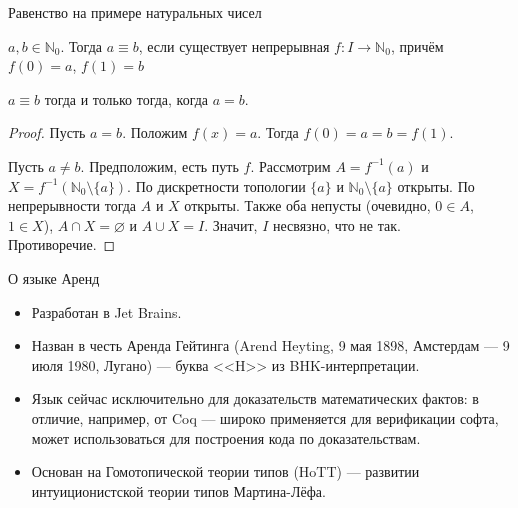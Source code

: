 \documentclass[aspectratio=169,dvipsnames,usenames]{beamer}
\begin{document}
\begin{frame}{Равенство на примере натуральных чисел}
\begin{dfn}$a,b \in \mathbb{N}_0$. Тогда $a\equiv b$, если существует непрерывная $f: I\rightarrow\mathbb{N}_0$, причём $f(0)=a$, $f(1)=b$\end{dfn}
\begin{lmm}$a\equiv b$ тогда и только тогда, когда $a=b$.\end{lmm}
\begin{proof}Пусть $a = b$. Положим $f(x) = a$. Тогда $f(0)=a=b=f(1)$.

Пусть $a \ne b$. Предположим, есть путь $f$. Рассмотрим $A=f^{-1}(a)$ и $X=f^{-1}(\mathbb{N}_0\setminus\{a\})$. 
По дискретности топологии $\{a\}$ и $\mathbb{N}_0\setminus\{a\}$ открыты. По непрерывности тогда $A$ и $X$ открыты.
Также оба непусты (очевидно, $0 \in A$, $1 \in X$), $A \cap X = \varnothing$ и $A \cup X = I$. Значит, $I$ несвязно, что не так.
Противоречие.
\end{proof}
\end{frame}

\begin{frame}{О языке Аренд}
\begin{itemize}
\item Разработан в Jet Brains.
\item Назван в честь Аренда Гейтинга (Arend Heyting, 9 мая 1898, Амстердам — 9 июля 1980, Лугано) --- буква <<H>> из BHK-интерпретации.
\item Язык сейчас исключительно для доказательств математических фактов: в отличие, например, от Coq ---
широко применяется для верификации софта, может использоваться для построения кода по доказательствам.
\item Основан на Гомотопической теории типов (HoTT) --- развитии интуиционистской теории типов Мартина-Лёфа.
\end{itemize}
\end{frame}
\end{document}
